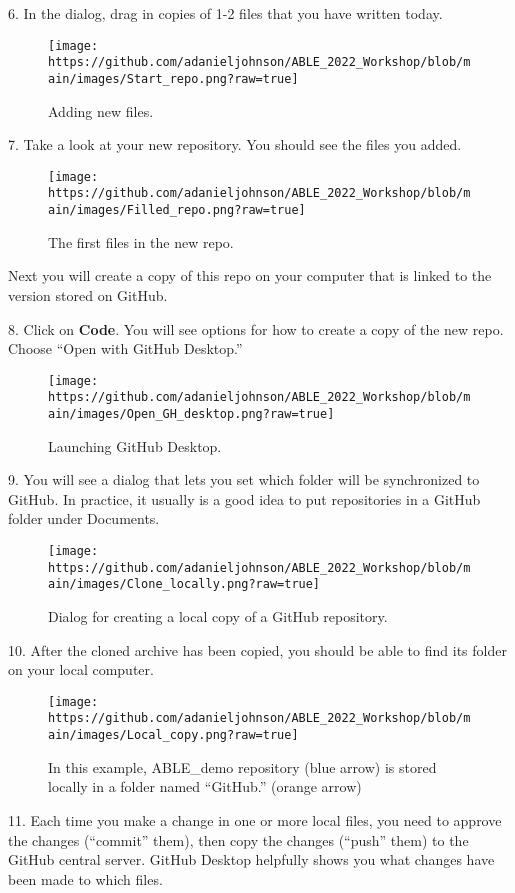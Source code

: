 \documentclass[
]{article}
\begin{document}
6. In the dialog, drag in copies of 1-2 files that you have written
today.

\begin{figure}
\centering
\texttt{[image: https://github.com/adanieljohnson/ABLE\_2022\_Workshop/blob/main/images/Start\_repo.png?raw=true]}
\caption{Adding new files.}
\end{figure}

7. Take a look at your new repository. You should see the files you
added.

\begin{figure}
\centering
\texttt{[image: https://github.com/adanieljohnson/ABLE\_2022\_Workshop/blob/main/images/Filled\_repo.png?raw=true]}
\caption{The first files in the new repo.}
\end{figure}

Next you will create a copy of this repo on your computer that is linked
to the version stored on GitHub.

8. Click on \textbf{Code}. You will see options for how to create a copy
of the new repo. Choose ``Open with GitHub Desktop.''

\begin{figure}
\centering
\texttt{[image: https://github.com/adanieljohnson/ABLE\_2022\_Workshop/blob/main/images/Open\_GH\_desktop.png?raw=true]}
\caption{Launching GitHub Desktop.}
\end{figure}

9. You will see a dialog that lets you set which folder will be
synchronized to GitHub. In practice, it usually is a good idea to put
repositories in a GitHub folder under Documents.

\begin{figure}
\centering
\texttt{[image: https://github.com/adanieljohnson/ABLE\_2022\_Workshop/blob/main/images/Clone\_locally.png?raw=true]}
\caption{Dialog for creating a local copy of a GitHub repository.}
\end{figure}

10. After the cloned archive has been copied, you should be able to find
its folder on your local computer.

\begin{figure}
\centering
\texttt{[image: https://github.com/adanieljohnson/ABLE\_2022\_Workshop/blob/main/images/Local\_copy.png?raw=true]}
\caption{In this example, ABLE\_demo repository (blue arrow) is stored
locally in a folder named ``GitHub.'' (orange arrow)}
\end{figure}

11. Each time you make a change in one or more local files, you need to
approve the changes (``commit'' them), then copy the changes (``push''
them) to the GitHub central server. GitHub Desktop helpfully shows you
what changes have been made to which files.
\end{document}
